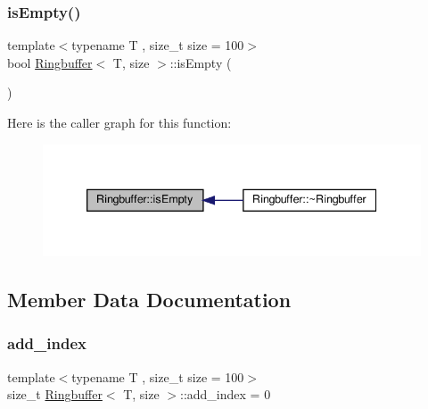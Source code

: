 \subsubsection{\texorpdfstring{is\+Empty()}{isEmpty()}}
{\footnotesize\ttfamily template$<$typename T , size\+\_\+t size = 100$>$ \\
bool \hyperlink{classRingbuffer}{Ringbuffer}$<$ T, size $>$\+::is\+Empty (\begin{DoxyParamCaption}{ }\end{DoxyParamCaption})}

Here is the caller graph for this function\+:
\nopagebreak
\begin{figure}[H]
\begin{center}
\leavevmode
\includegraphics[width=339pt]{classRingbuffer_a2ebb965f90ff6a14f184619ef3dfeca6_icgraph}
\end{center}
\end{figure}


\subsection{Member Data Documentation}
\mbox{\label{classRingbuffer_ad4ddec2757f8c74de1107f96a5b99205}} 
\subsubsection{\texorpdfstring{add\+\_\+index}{add\_index}}
{\footnotesize\ttfamily template$<$typename T , size\+\_\+t size = 100$>$ \\
size\+\_\+t \hyperlink{classRingbuffer}{Ringbuffer}$<$ T, size $>$\+::add\+\_\+index = 0\hspace{0.3cm}{\ttfamily [private]}}

\mbox{\label{classRingbuffer_a335ecc63190c7e834e1ef5c694c0513a}} 
